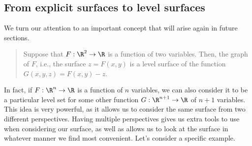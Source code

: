 \documentclass{ximera}
\begin{document}



\subsection{From explicit surfaces to level surfaces}

We turn our attention to an important concept that will arise again in
future sections.

\begin{quote}
Suppose that $F:\R^2 \to \R$ is a function of two variables.  Then, the graph of $F$, i.e., the surface $z = F(x,y)$ is a level surface of the function $G(x,y,z) = F(x,y) - z.$
\end{quote}

In fact, if $F: \R^n \to \R$ is a function of $n$ variables, we can also consider it to be a particular level set for some other function $G: \R^{n+1} \to \R$ of $n+1$ variables.  This idea is very powerful, as it allows us to consider the same surface
from two different perspectives.  Having multiple perspectives gives us extra tools 
to use when considering our surface, as well as allows us to look at the surface 
in whatever manner we find most convenient.  Let's consider a specific example.
\end{document}
